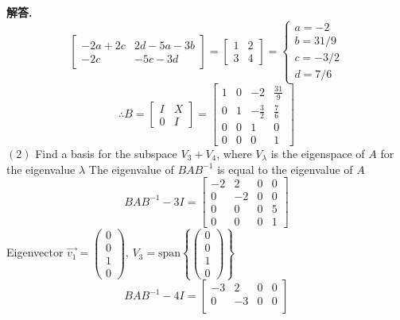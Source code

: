 \documentclass[10pt, a4paper, oneside]{article}
\newenvironment{solution}{\par\noindent\textbf{解答. }}{\par}
\begin{document}
\begin{CJK}{UTF8}{gbsn}
\begin{solution}
    $$\begin{bmatrix}
      -2a + 2c & 2d-5a-3b \\ 
      -2c & -5c-3d 
    \end{bmatrix} = \begin{bmatrix}
      1 & 2 \\ 3 & 4 
    \end{bmatrix} = \begin{cases}
      a = -2 \\
      b = 31/9 \\
      c = -3/2 \\
      d = 7/6
    \end{cases}$$
    $$\therefore B = \begin{bmatrix}
      I & X \\ 
      0 & I
    \end{bmatrix} = \begin{bmatrix}
      1 & 0 & -2 & \frac{31}{9} \\
      0 & 1  & -\frac{3}{2} & \frac{7}{6} \\
      0 & 0 & 1 & 0 \\
      0 & 0 & 0 & 1
    \end{bmatrix}$$
    $(2)$ Find a basis for the subspace $V_3 + V_4$, where $V_\lambda$ is the eigenspace of $A$ for the eigenvalue $\lambda$ \newline
    The eigenvalue of $BAB^{-1}$ is equal to the eigenvalue of $A$
    $$ BAB^{-1} - 3I  = \begin{bmatrix}
      -2 & 2 & 0 & 0 \\
      0 & -2 & 0 & 0 \\
      0 & 0 & 0 & 5 \\
      0 & 0 & 0 & 1 
    \end{bmatrix}$$
    Eigenvector $\vec{v_1} = \begin{pmatrix}
      0 \\ 0 \\ 1 \\ 0
    \end{pmatrix}$, $V_3 = \text{span}\left\{ \begin{pmatrix}  0 \\ 0 \\ 1 \\ 0\end{pmatrix}\right\}$  
    $$ BAB^{-1} - 4I  = \begin{bmatrix}
      -3 & 2 & 0 & 0 \\
      0 & -3 & 0 & 0 \\

\end{bmatrix}$$
\end{solution}
\end{CJK}
\end{document}
